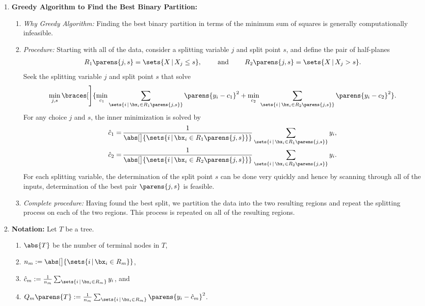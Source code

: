 \documentclass[12pt]{article}
\begin{document}
\begin{enumerate}[label=\textbf{\arabic*.}]
	\item \textbf{Greedy Algorithm to Find the Best Binary Partition:} 
	\begin{enumerate}
		\item \textit{Why Greedy Algorithm:} Finding the best binary partition in terms of the minimum sum of squares is generally computationally infeasible. 
		\item \textit{Procedure:} Starting with all of the data, consider a splitting variable $j$ and split point $s$, and define the pair of half-planes
		\begin{align}
			R_1 \parens{j, s} = \sets{X \,\vert\, X_j \le s}, \qquad \text{ and } \qquad R_2 \parens{j, s} = \sets{X \,\vert\, X_j > s}. 
		\end{align}
		Seek the splitting variable $j$ and split point $s$ that solve 
		\begin{align}
			\min_{j, s} \braces[\Bigg]{\min_{c_1} \sum_{\sets{i \,\vert\, \bx_i \in R_1 \parens{j, s}}} \parens{y_i - c_1}^2 + \min_{c_2} \sum_{\sets{i \,\vert\, \bx_i \in R_2 \parens{j, s}}} \parens{y_i - c_2}^2}. 
		\end{align}
		For any choice $j$ and $s$, the inner minimization is solved by 
		\begin{align*}
			\hat{c}_1 = & \, \frac{1}{\abs[\big]{\sets{i \,\vert\, \bx_i \in R_1 \parens{j, s}}}} \sum_{ \sets{i \,\vert\, \bx_i \in R_1 \parens{j, s}}} y_i, \\ 
			\hat{c}_2 = & \, \frac{1}{\abs[\big]{\sets{i \,\vert\, \bx_i \in R_2 \parens{j, s}}}} \sum_{ \sets{i \,\vert\, \bx_i \in R_2 \parens{j, s}}} y_i. 
		\end{align*}
		For each splitting variable, the determination of the split point $s$ can be done very quickly and hence by scanning through all of the inputs, determination of the best pair $\parens{j, s}$ is feasible. 
		
		\item \textit{Complete procedure:} Having found the best split, we partition the data into the two resulting regions and repeat the splitting process on each of the two regions. This process is repeated on all of the resulting regions. 
	\end{enumerate}
	
	\item \textbf{Notation:} Let $T$ be a tree. 
	\begin{enumerate}
		\item $\abs{T}$ be the number of terminal nodes in $T$, 
		\item $n_m := \abs[\big]{\sets{i \,\vert\, \bx_i \in R_m}}$, 
		\item $\hat{c}_m := \frac{1}{n_m} \sum_{\sets{i \,\vert\, \bx_i \in R_m}} y_i$, and 
		\item $Q_m \parens{T} := \frac{1}{n_m} \sum_{\sets{i \,\vert\, \bx_i \in R_m}} \parens{y_i - \hat{c}_m}^2$. 
	\end{enumerate}
	

\end{enumerate}
\end{document}

